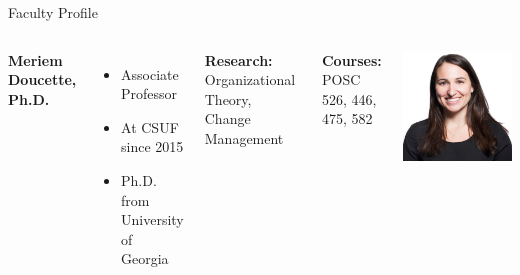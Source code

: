 \documentclass[10pt]{beamer}
\newlength{\imageheight}
\begin{document}
        \begin{frame}{Faculty Profile}
        \begin{columns}[t]
        \textbf{Meriem Doucette, Ph.D.}
        \begin{itemize}
        \item Associate Professor
        \item At CSUF since 2015
        \item Ph.D. from University of Georgia
        \end{itemize}
        
        \textbf{Research:} Organizational Theory, Change Management
        
        \textbf{Courses:} POSC 526, 446, 475, 582
        
        \vspace*{0.5cm}
        \includegraphics[height=\imageheight]{images/doucette.png}
        \end{columns}
        \end{frame}
        
\end{document}
